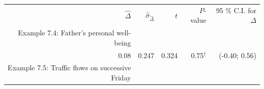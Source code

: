 \documentclass[11pt,a4paper,openany]{book}
\begin{document}
\begin{longtable}[]{@{}rrrrr@{}}
\begin{minipage}[t]{0.29\columnwidth}
\(\hat{\Delta}\)\strut
\end{minipage} & \begin{minipage}[t]{0.13\columnwidth}\raggedleft\strut
\(\hat{\sigma}_{\hat{\Delta}}\)\strut
\end{minipage} & \begin{minipage}[t]{0.18\columnwidth}\raggedleft\strut
\(t\)\strut
\end{minipage} & \begin{minipage}[t]{0.13\columnwidth}\raggedleft\strut
\(P\)-value\strut
\end{minipage} & \begin{minipage}[t]{0.12\columnwidth}\raggedleft\strut
95 \% C.I. for \(\Delta\)\strut
\end{minipage}\tabularnewline
\begin{minipage}[t]{0.29\columnwidth}\raggedleft\strut
Example 7.4: Father's personal well-being\strut
\end{minipage} & \begin{minipage}[t]{0.13\columnwidth}\raggedleft\strut
\strut
\end{minipage} & \begin{minipage}[t]{0.18\columnwidth}\raggedleft\strut
\strut
\end{minipage} & \begin{minipage}[t]{0.13\columnwidth}\raggedleft\strut
\strut
\end{minipage} & \begin{minipage}[t]{0.12\columnwidth}\raggedleft\strut
\strut
\end{minipage}\tabularnewline
\begin{minipage}[t]{0.29\columnwidth}\raggedleft\strut
0.08\strut
\end{minipage} & \begin{minipage}[t]{0.13\columnwidth}\raggedleft\strut
0.247\strut
\end{minipage} & \begin{minipage}[t]{0.18\columnwidth}\raggedleft\strut
0.324\strut
\end{minipage} & \begin{minipage}[t]{0.13\columnwidth}\raggedleft\strut
0.75\(^{\dagger}\)\strut
\end{minipage} & \begin{minipage}[t]{0.12\columnwidth}\raggedleft\strut
(-0.40; 0.56)\strut
\end{minipage}\tabularnewline
\begin{minipage}[t]{0.29\columnwidth}\raggedleft\strut
Example 7.5: Traffic flows on successive Friday\strut

\end{minipage}
\end{longtable}
\end{document}
